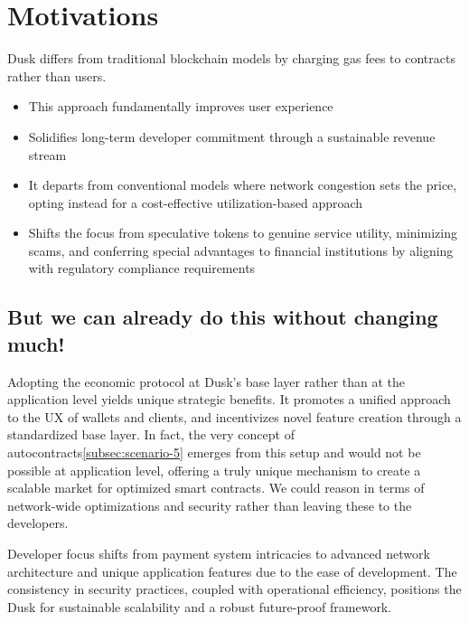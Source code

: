 \documentclass[twocolumn, nofootinbib]{revtex4-2}
\begin{document}
    \section{Motivations}\label{sec:motivations}
    Dusk differs from traditional blockchain models by charging gas fees to
    contracts rather than users.

    \begin{itemize}
        \item This approach fundamentally improves user experience
        \item Solidifies long-term developer commitment through a sustainable
              revenue stream
        \item It departs from conventional models where network congestion sets
              the price, opting instead for a cost-effective utilization-based
              approach
        \item Shifts the focus from speculative tokens to genuine service
              utility, minimizing scams, and conferring special advantages to
              financial institutions by aligning with regulatory compliance
              requirements
    \end{itemize}

    \subsection{But we can already do this without changing much!}\label{subsec:but-we-can-already-do-this}
    Adopting the economic protocol at Dusk's base layer rather than at the
    application level yields unique strategic benefits.
    It promotes a unified approach to the UX of wallets and clients, and
    incentivizes novel feature creation through a standardized base layer.
    In fact, the very concept of autocontracts\ref{subsec:scenario-5} emerges
    from this setup and would not be possible at application level, offering a
    truly unique mechanism to create a scalable market for optimized smart
    contracts.
    We could reason in terms of network-wide optimizations and security rather
    than leaving these to the developers.

    Developer focus shifts from payment system intricacies to advanced network
    architecture and unique application features due to the ease of development.
    The consistency in security practices, coupled with operational efficiency,
    positions the Dusk for sustainable scalability and a robust future-proof
    framework.
\end{document}
